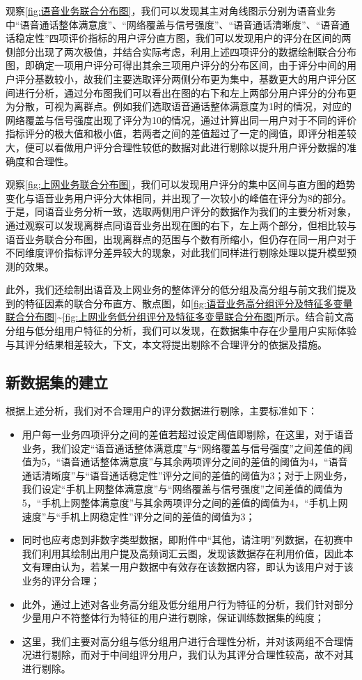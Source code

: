 \documentclass{MathorCupmodeling}
\begin{document}
	观察\textcolor{blue}{\cref{fig:语音业务联合分布图}}，我们可以发现其主对角线图示分别为语音业务中“语音通话整体满意度”、“网络覆盖与信号强度”、“语音通话清晰度”、“语音通话稳定性”四项评价指标的用户评分直方图，我们可以发现用户的评分在区间的两侧部分出现了两次极值，并结合实际考虑，利用上述四项评分的数据绘制联合分布图，即确定一项用户评分可得出其余三项用户评分的分布区间，由于评分中间的用户评分基数较小，故我们主要选取评分两侧分布更为集中，基数更大的用户评分区间进行分析，通过分布图我们可以看出在图的右下和左上两部分用户评分的分布更为分散，可视为离群点。例如我们选取语音通话整体满意度为1时的情况，对应的网络覆盖与信号强度出现了评分为10的情况，通过计算出同一用户对于不同的评价指标评分的极大值和极小值，若两者之间的差值超过了一定的阈值，即评分相差较大，便可以看做用户评分合理性较低的数据对此进行剔除以提升用户评分数据的准确度和合理性。
	
	观察\textcolor{blue}{\cref{fig:上网业务联合分布图}}，我们可以发现用户评分的集中区间与直方图的趋势变化与语音业务用户评分大体相同，并出现了一次较小的峰值在评分为8的部分。于是，同语音业务分析一致，选取两侧用户评分的数据作为我们的主要分析对象，通过观察可以发现离群点同语音业务出现在图的右下，左上两个部分，但相比较与语音业务联合分布图，出现离群点的范围与个数有所缩小，但仍存在同一用户对于不同维度评价指标评分差异较大的现象，对此我们同样进行剔除处理以提升模型预测的效果。

	此外，我们还绘制出语音及上网业务的整体评分的低分组及高分组与前文我们提及到的特征因素的联合分布直方、散点图，如\textcolor{blue}{\cref{fig:语音业务高分组评分及特征多变量联合分布图}}\textasciitilde\textcolor{blue}{\cref{fig:上网业务低分组评分及特征多变量联合分布图}}所示。结合前文高分组与低分组用户特征的分析，我们可以发现，在数据集中存在少量用户实际体验与其评分结果相差较大，下文，本文将提出剔除不合理评分的依据及措施。

	\subsection{新数据集的建立}
	根据上述分析，我们对不合理用户的评分数据进行剔除，主要标准如下：
	\begin{itemize}
		\item 用户每一业务四项评分之间的差值若超过设定阈值即剔除，在这里，对于语音业务，我们设定“语音通话整体满意度”与“网络覆盖与信号强度”之间差值的阈值为5，“语音通话整体满意度”与其余两项评分之间的差值的阈值为4，“语音通话清晰度”与“语音通话稳定性”评分之间的差值的阈值为3；对于上网业务，我们设定“手机上网整体满意度”与“网络覆盖与信号强度”之间差值的阈值为5，“手机上网整体满意度”与其余两项评分之间的差值的阈值为4，“手机上网速度”与“手机上网稳定性”评分之间的差值的阈值为3；
		\item 同时也应考虑到非数字类型数据，即附件中“其他，请注明”列数据，在初赛中我们利用其绘制出用户提及高频词汇云图，发现该数据存在利用价值，因此本文有理由认为，若某一用户数据中有效存在该数据内容，即认为该用户对于该业务的评分合理；
		\item 此外，通过上述对各业务高分组及低分组用户行为特征的分析，我们针对部分少量用户不符整体行为特征的用户进行剔除，保证训练数据集的纯度；
		\item 这里，我们主要对高分组与低分组用户进行合理性分析，并对该两组不合理情况进行剔除，而对于中间组评分用户，我们认为其评分合理性较高，故不对其进行剔除。
	\end{itemize}
	
\end{document}
